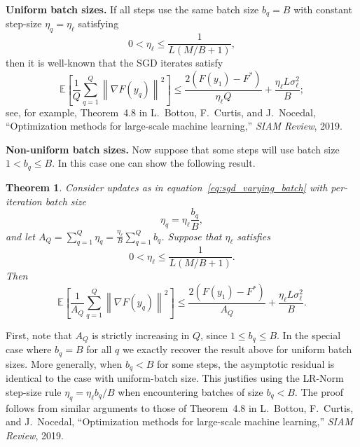 \documentclass[twoside]{article}
\def\eqref#1{equation~\ref{#1}}
\newtheorem*{theorem*}{Theorem}
\newcommand{\norm}[1]{\left\lVert#1\right\rVert}
\newcommand{\lrn}{{LR-Norm}\xspace}
\begin{document}
\textbf{Uniform batch sizes.} If all steps use the same batch size $b_q=B$ with constant step-size $\eta_q = \eta_\ell$ satisfying
\[
0 < \eta_\ell \le \frac{1}{L(M/B + 1)},
\]
then it is well-known that the SGD iterates satisfy
\[
\mathbb{E}\left[\frac{1}{Q} \sum_{q=1}^Q \norm{\nabla F(y_q)}^2\right] \le \frac{2(F(y_1) - F^*)}{\eta_\ell Q} + \frac{\eta_\ell L \sigma_\ell^2}{B};
\]
see, for example, Theorem~4.8 in L.~Bottou, F.~Curtis, and J.~Nocedal, ``Optimization methods for large-scale machine learning,'' \textit{SIAM Review}, 2019.

\textbf{Non-uniform batch sizes.} Now suppose that some steps will use batch size $1 < b_q \le B$. In this case one can show the following result.

\begin{theorem*}
Consider updates as in \eqref{eq:sgd_varying_batch} with per-iteration batch size
\[
\eta_q = \eta_\ell \frac{b_q}{B},
\]
and let $A_Q = \sum_{q=1}^Q \eta_q = \frac{\eta_\ell}{B} \sum_{q=1}^Q b_q$.
Suppose that $\eta_\ell$ satisfies
\[
0 < \eta_\ell \le \frac{1}{L (M/B + 1)}.
\]
Then
\[
\mathbb{E}\left[ \frac{1}{A_Q} \sum_{q=1}^Q \norm{\nabla F(y_q)}^2\right] \le \frac{2(F(y_1) - F^*)}{A_Q} + \frac{\eta_\ell L \sigma_\ell^2}{B}.
\]
\end{theorem*}

First, note that $A_Q$ is strictly increasing in $Q$, since $1 \le b_q \le B$. In the special case where $b_q = B$ for all $q$ we exactly recover the result above for uniform batch sizes. More generally, when $b_q < B$ for some steps, the asymptotic residual is identical to the case with uniform-batch size. This justifies using the \lrn{} step-size rule $\eta_q = \eta_\ell b_q / B$ when encountering batches of size $b_q < B$. The proof follows from similar arguments to those of Theorem~4.8 in L.~Bottou, F.~Curtis, and J.~Nocedal, ``Optimization methods for large-scale machine learning,'' \textit{SIAM Review}, 2019.
\end{document}
